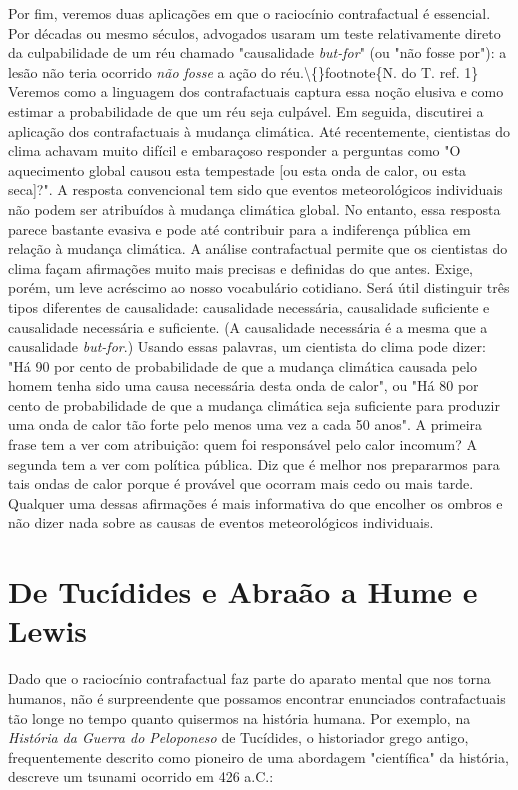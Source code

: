 \documentclass[11pt,a5paper,twoside]{book}
\begin{document}
Por fim, veremos duas aplicações em que o raciocínio contrafactual é essencial. Por décadas ou mesmo séculos, advogados usaram um teste relativamente direto da culpabilidade de um réu chamado "causalidade \textit{but-for}" (ou "não fosse por"): a lesão não teria ocorrido \textit{não fosse} a ação do réu.\textbackslash\{\}footnote\{N. do T. ref. 1\} Veremos como a linguagem dos contrafactuais captura essa noção elusiva e como estimar a probabilidade de que um réu seja culpável. Em seguida, discutirei a aplicação dos contrafactuais à mudança climática. Até recentemente, cientistas do clima achavam muito difícil e embaraçoso responder a perguntas como "O aquecimento global causou esta tempestade [ou esta onda de calor, ou esta seca]?". A resposta convencional tem sido que eventos meteorológicos individuais não podem ser atribuídos à mudança climática global. No entanto, essa resposta parece bastante evasiva e pode até contribuir para a indiferença pública em relação à mudança climática. A análise contrafactual permite que os cientistas do clima façam afirmações muito mais precisas e definidas do que antes. Exige, porém, um leve acréscimo ao nosso vocabulário cotidiano. Será útil distinguir três tipos diferentes de causalidade: causalidade necessária, causalidade suficiente e causalidade necessária e suficiente. (A causalidade necessária é a mesma que a causalidade \textit{but-for}.) Usando essas palavras, um cientista do clima pode dizer: "Há 90 por cento de probabilidade de que a mudança climática causada pelo homem tenha sido uma causa necessária desta onda de calor", ou "Há 80 por cento de probabilidade de que a mudança climática seja suficiente para produzir uma onda de calor tão forte pelo menos uma vez a cada 50 anos". A primeira frase tem a ver com atribuição: quem foi responsável pelo calor incomum? A segunda tem a ver com política pública. Diz que é melhor nos prepararmos para tais ondas de calor porque é provável que ocorram mais cedo ou mais tarde. Qualquer uma dessas afirmações é mais informativa do que encolher os ombros e não dizer nada sobre as causas de eventos meteorológicos individuais.

\section{De Tucídides e Abraão a Hume e Lewis}
Dado que o raciocínio contrafactual faz parte do aparato mental que nos torna humanos, não é surpreendente que possamos encontrar enunciados contrafactuais tão longe no tempo quanto quisermos na história humana. Por exemplo, na \textit{História da Guerra do Peloponeso} de Tucídides, o historiador grego antigo, frequentemente descrito como pioneiro de uma abordagem "científica" da história, descreve um tsunami ocorrido em 426 a.C.:
\end{document}
